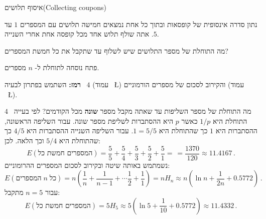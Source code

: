 \begin{comment}
\solution{3}

חידה שמיוחסת ל-%
\L{Abraham Lincoln}
שואל: "אם תקרא לזנב של כלב רגל, כמה רגליים יש לכלב?" התשובה היא שלקרוא לזנב רגל לא הופך אותו לרגל ולכן לכלב עדיין יש ארבע רגליים. ברור שאם
$A$
יודע את העתיד המחכה ל-%
$B$
זה לא משנה את סיכויו להשתחרר.

\sml{}

אין סימולציה כי הבעיה שואלת אם ההסתברות משתנה לאור ידע מסויים, אבל הראנו שאין שינוי.

\bigskip

\textbf{\Large דילמת האסיר והבעיה של
\L{Monty Hall}}

\medskip

נרחיב את פתרון 
$3$:
הסיכוי ש-%
$A$
ישתחרר לא מושפע ממידע נמסר לו. אפשר לשקר לו או אפילו לא למסור לו כלום כי ההחלטה את מי לשחרר כבר נלקח.

נניח ששינו את הכללים של בעיית 
\L{Monty Hall}
כך ש-%
\L{Monty}
פותח דלת (כל דלת, למעשה) אבל המתחרה
\textbf{לא רשאי לשנות את החלטתו!}
ההסתברויות לא משתנות: הסיכוי לזכות במכונית הוא
$1/3$
והסיכוי להפסיד הוא
$2/3$.
המצב שקול לדילמת האסיר.

העובדה שהמתחרה רשאי לשנות את החלטתו היא הסיבה שיש משמעות לפתיחת הדלת. שוב, ההסבתרויות לא משתנות: הסיכוי לזכות במכונית הוא
$1/3$
והסיכוי להפסיד הוא
$2/3$.
המצב שקול לדילמת האסיר. אבל ה-%
$2/3$
"מרוכז" בדלת שנשארה סגורה, ולכן, המתחרה יכול הכפיל את סיכוייו לנצח על ידי שינוי ההחלטה.
\end{comment}


\begin{prob}{איסוף תלושים}{}{(Collecting coupons)}

נתון סדרה אינסופית של קופסאות ובתוך כל אחת נמצאים חמישה תלושים עם המספרים 
$1$
עד
$5$.
אתה שולף תלוש אחד מכל קופסה אחת אחרי השנייה.

מה התוחלת של מספר התלושים שיש לשלוף עד שתקבל את כל חמשת המספרים?

פתח נוסחה לתוחלת ל-%
$n$
מספרים.

\textbf{רמז:}
השתמש בפתרון לבעיה%
~$4$
(עמוד%
~\L{\pageref{p.four}})
והקירוב לסכום של מספרים הורמוניים 
(עמוד%
~\L{\pageref{p.harmonic}}).
\end{prob}

\solution{}

מה התוחלת של מספר השליפות עד שאתה מקבל מספר
\textbf{שונה}
מכל הקודמים? לפי בעייה~%
$4$
התוחלת היא
$1/p$
כאשר 
$p$
היא ההסתברות לשליפת מספר שונה. עבור השליפה הראשונה, ההסתברות היא 
$1$
כך שהתוחלת היא
$1=5/5$.
עבור השליפה השנייה ההסתברות היא 
$4/5$
כך שהתוחלת היא 
$5/4$
וכך הלאה. לכן:
\[
E(\textrm{המספרים חמשת כל}) = \frac{5}{5}+\frac{5}{4} + \frac{5}{3} + \frac{5}{2} + \frac{5}{1} = \frac{}{} =\frac{1370}{120}\approx 11.4167\,.
\]
נשמתמש באותה שיטה ובקירוב לסכום המספרים ההרומוניים:
\[
E(\textrm{המספרים}\;n \;\textrm{כל}) = n\left(\frac{1}{n}+\frac{1}{n-1} + \cdots \frac{1}{2} + \frac{1}{1}\right) =nH_n\approx n\left(\ln n + \frac{1}{2n} + 0.5772\right)\,. 
\]
עבור
$n=5$
מתקבל:
\[
E(\textrm{המספרים חמשת כל}) =5H_5\approx 5\left(\ln 5 + \frac{1}{10} + 0.5772\right) \approx 11.4332\,.
\]

